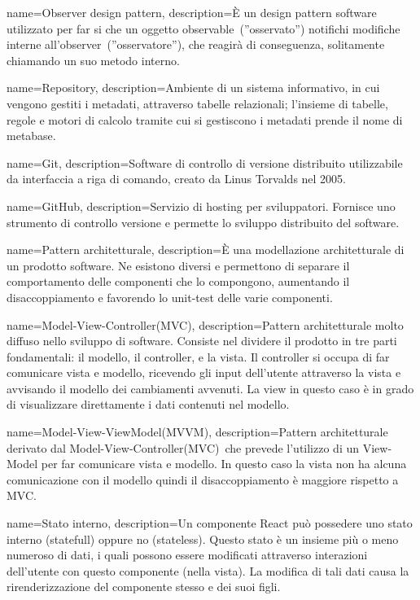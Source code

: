 {
  name={Observer design pattern},
  description={È un design pattern software utilizzato per far si che un oggetto observable\glo\ (”osservato”) notifichi modifiche interne all’observer\glo\ (”osservatore”), che reagirà di conseguenza, solitamente chiamando un suo metodo interno.}
}

{
  name={Repository},
  description={Ambiente di un sistema informativo, in cui vengono gestiti i metadati, attraverso tabelle relazionali; l’insieme di tabelle, regole e motori di calcolo tramite cui si gestiscono i metadati prende il nome di metabase.}
}

{
  name={Git},
  description={Software di controllo di versione distribuito utilizzabile da interfaccia a riga di comando, creato da Linus Torvalds nel 2005.}
}

{
  name={GitHub},
  description={Servizio di hosting per sviluppatori. Fornisce uno strumento di controllo versione e permette lo sviluppo distribuito del software.}
}

{
  name={Pattern architetturale},
  description={È una modellazione architetturale di un prodotto software. Ne esistono diversi e permettono di separare il comportamento delle componenti che lo compongono, aumentando il disaccoppiamento e favorendo lo unit-test delle varie componenti.}
}

{
  name={Model-View-Controller(MVC)},
  description={Pattern architetturale molto diffuso nello sviluppo di software. Consiste nel dividere il prodotto in tre parti fondamentali: il modello, il controller, e la vista. Il controller si occupa di far comunicare vista e modello, ricevendo gli input dell’utente attraverso la vista e avvisando il modello dei cambiamenti avvenuti. La view in questo caso è in grado di visualizzare direttamente i dati contenuti nel modello.}
}

{
  name={Model-View-ViewModel(MVVM)},
  description={Pattern architetturale derivato dal Model-View-Controller(MVC)\glo\ che prevede l’utilizzo di un View-Model per far comunicare vista e modello. In questo caso la vista non ha alcuna comunicazione con il modello quindi il disaccoppiamento è maggiore rispetto a MVC.}
}

{
  name={Stato interno},
  description={Un componente React può possedere uno stato interno (statefull) oppure no (stateless). Questo stato è un insieme più o meno numeroso di dati, i quali possono essere modificati attraverso interazioni dell’utente con questo componente (nella vista). La modifica di tali dati causa la rirenderizzazione del componente stesso e dei suoi figli.}
}

